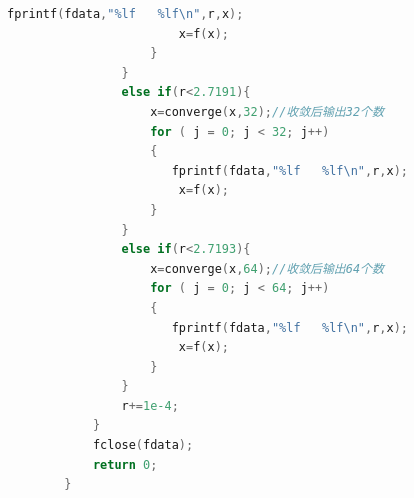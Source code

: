\documentclass[10pt, a4paper]{article}
\begin{document}
\begin{lstlisting}[language=C]
                       fprintf(fdata,"%lf   %lf\n",r,x);
                        x=f(x);
                    }
                }
                else if(r<2.7191){
                    x=converge(x,32);//收敛后输出32个数
                    for ( j = 0; j < 32; j++)
                    {
                       fprintf(fdata,"%lf   %lf\n",r,x);
                        x=f(x);
                    }
                }
                else if(r<2.7193){
                    x=converge(x,64);//收敛后输出64个数
                    for ( j = 0; j < 64; j++)
                    {
                       fprintf(fdata,"%lf   %lf\n",r,x);
                        x=f(x);
                    }
                }
                r+=1e-4;
            }    
            fclose(fdata);
            return 0;
        }
        
        
    \end{lstlisting}
\end{document}
